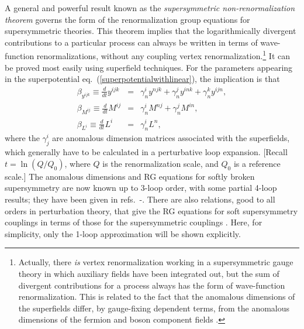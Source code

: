 \documentclass[11pt]{article}
\def\beq{\begin{eqnarray}}
\def\eeq{\end{eqnarray}}
\begin{document}
A general and powerful result known as the {\it supersymmetric
non-renormalization theorem} \cite{nonrentheo} governs the form of the
renormalization group equations for supersymmetric theories. This theorem
implies that the logarithmically divergent contributions to a particular
process can always be written in terms of wave-function renormalizations,
without any coupling vertex renormalization.\footnote{Actually, there {\it
is} vertex renormalization working in a supersymmetric gauge theory in
which auxiliary fields have been integrated out, but the sum of divergent
contributions for a process always has the form of wave-function
renormalization. This is related to the fact that the anomalous dimensions
of the superfields differ, by gauge-fixing dependent terms, from the
anomalous dimensions of the fermion and boson component fields
\cite{Jonesreview}.} It can be proved most easily using superfield
techniques. For the parameters appearing in the superpotential
eq.~(\ref{superpotentialwithlinear}), the implication is that
\beq
\beta_{y^{ijk}} \equiv \frac{d}{dt}y^{ijk} \!&=&\! 
\gamma^i_n y^{njk} + \gamma^j_n y^{ink} + \gamma^k_n y^{ijn},
\label{eq:genyrge}
\\
\beta_{M^{ij}} \equiv \frac{d}{dt}M^{ij} \!&=&\! 
\gamma^i_n M^{nj} + \gamma^j_n M^{in},
\label{eq:genMrge}
\\
\beta_{L^{i}} \equiv \frac{d}{dt}L^{i} \!&=&\! 
\gamma^i_n L^{n},
\eeq
where the $\gamma^i_j$ are anomalous dimension matrices associated with
the superfields, which generally have to be calculated in a perturbative
loop expansion. [Recall $t = \ln(Q/Q_0)$, where $Q$ is the renormalization
scale, and $Q_0$ is a reference scale.] The anomalous dimensions and RG
equations for softly broken supersymmetry are now known up to 3-loop
order, with some partial 4-loop results; they have been given in
refs.~\cite{rges2gauge}-\cite{fourloops}. 
There are also relations, good to all orders in perturbation
theory, that give the RG equations for soft supersymmetry couplings in
terms of those for the supersymmetric couplings \cite{Shifman,allorders}.
Here, for simplicity, only the 1-loop approximation will be shown
explicitly. 
\end{document}
